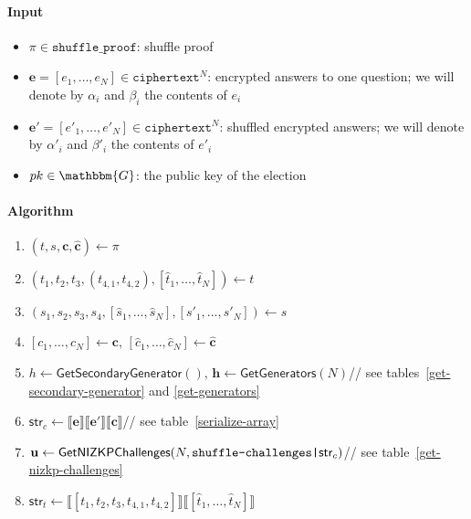 \documentclass[a4paper]{article}
\newcommand{\G}{\mathbbm{G}}
\begin{document}
\begin{table}
  \small
  \begin{framed}
    \noindent\paragraph{Input}
    \begin{itemize}
    \item $\pi\in\texttt{shuffle\_proof}$: shuffle proof
    \item $\textbf{e}=[e_1,\dots,e_N]\in\texttt{ciphertext}^N$:
      encrypted answers to one question; we will denote by
      $\alpha_i$ and $\beta_i$ the contents of $e_i$
    \item $\textbf{e}'=[e'_1,\dots,e'_N]\in\texttt{ciphertext}^N$:
      shuffled encrypted answers; we will denote by
      $\alpha'_i$ and $\beta'_i$ the contents of $e'_i$
    \item $pk\in\G$: the public key of the election
    \end{itemize}
    \noindent\paragraph{Algorithm}
    \begin{enumerate}
    \item $(t,s,\textbf{c},\hat{\textbf{c}})\leftarrow\pi$
    \item $(t_1,t_2,t_3,(t_{4,1},t_{4,2}),[\hat{t}_1,\dots,\hat{t}_N])\leftarrow t$
    \item $(s_1,s_2,s_3,s_4,[\hat{s}_1,\dots,\hat{s}_N],[s'_1,\dots,s'_N])\leftarrow s$
    \item $[c_1,\dots,c_N]\leftarrow\textbf{c}$,
      $[\hat{c}_1,\dots,\hat{c}_N]\leftarrow\hat{\textbf{c}}$
    \item $h\leftarrow\textsf{GetSecondaryGenerator}()$,
      $\textbf{h}\leftarrow\textsf{GetGenerators}(N)$\hfill// see
      tables~\ref{get-secondary-generator} and \ref{get-generators}
    \item
      $\textsf{str}_c\leftarrow\llbracket\textbf{e}\rrbracket\llbracket\textbf{e}'\rrbracket\llbracket\textbf{c}\rrbracket$\hfill//
      see table~\ref{serialize-array}
    \item
      $\textbf{u}\leftarrow\textsf{GetNIZKPChallenges}(N,\verb=shuffle-challenges|=\textsf{str}_c)$\hfill//
      see table~\ref{get-nizkp-challenges}
    \item
      $\textsf{str}_t\leftarrow\llbracket[t_1,t_2,t_3,t_{4,1},t_{4,2}]\rrbracket\llbracket[\hat{t}_1,\dots,\hat{t}_N]\rrbracket$

\end{enumerate}
\end{framed}
\end{table}
\end{document}
